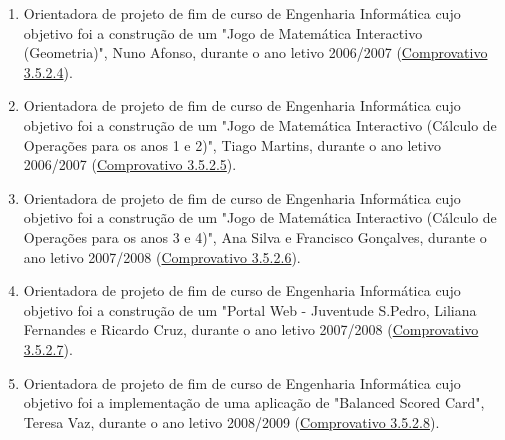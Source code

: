 \documentclass[11pt]{article}
\begin{document}
\begin{enumerate}
\item {Orientadora de projeto de fim de curso de Engenharia Informática cujo objetivo foi a construção de um "Jogo de Matemática Interactivo (Geometria)", Nuno Afonso, durante o ano letivo 2006/2007 (\href{run:CoOrientTrabalhos/projFimCursoEI.pdf}{Comprovativo 3.5.2.4}).}
\item {Orientadora de projeto de fim de curso de Engenharia Informática cujo objetivo foi a construção de um "Jogo de Matemática Interactivo (Cálculo de Operações para os anos 1 e 2)", Tiago Martins, durante o ano letivo 2006/2007 (\href{run:CoOrientTrabalhos/projFimCursoEI.pdf}{Comprovativo 3.5.2.5}).}
\item {Orientadora de projeto de fim de curso de Engenharia Informática cujo objetivo foi a construção de um "Jogo de Matemática Interactivo (Cálculo de Operações para os anos 3 e 4)", Ana Silva e Francisco Gonçalves, durante o ano letivo 2007/2008 (\href{run:CoOrientTrabalhos/projFimCursoEI.pdf}{Comprovativo 3.5.2.6}).}
\item {Orientadora de projeto de fim de curso de Engenharia Informática cujo objetivo foi a construção de um "Portal Web - Juventude S.Pedro,  Liliana Fernandes e Ricardo Cruz, durante o ano letivo 2007/2008 (\href{run:CoOrientTrabalhos/projFimCursoEI.pdf}{Comprovativo 3.5.2.7}).}
\item {Orientadora de projeto de fim de curso de Engenharia Informática cujo objetivo foi a implementação de uma aplicação de "Balanced Scored Card", Teresa Vaz, durante o ano letivo 2008/2009 (\href{run:CoOrientTrabalhos/projFimCursoEI.pdf}{Comprovativo 3.5.2.8}).}
\end{enumerate}
\end{document}

